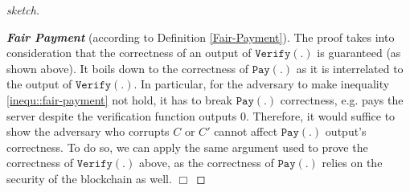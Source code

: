 \begin{proof}[sketch]
\

\noindent\textbf{\textit{Fair Payment}} (according to Definition \ref{Fair-Payment}).  The proof  takes into consideration that the correctness of an output of $\mathtt{Verify}(.)$  is guaranteed (as shown above). It boils down to the correctness of $\mathtt{Pay}(.)$ as it is interrelated to the output of $\mathtt{Verify}(.)$. In particular, for the adversary to make  inequality \ref{inequ::fair-payment} not  hold, it has to break $\mathtt{Pay}(.)$ correctness, e.g. pays the server despite the verification function outputs $0$. Therefore, it would suffice to show the adversary who corrupts $C$ or $C'$ cannot affect $\mathtt{Pay}(.)$ output's correctness. To do so, we can apply the same argument used to prove  the correctness of $\mathtt{Verify}(.)$ above, as the correctness of  $\mathtt{Pay}(.)$ relies on the security of the blockchain as well.  \hfill\(\Box\)
\end{proof}
